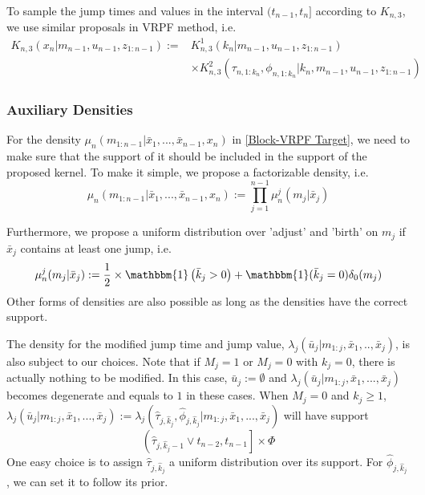 \documentclass[12pt,a4paper]{article}
\begin{document}
To sample the jump times and values in the interval $(t_{n-1},t_n]$ according to $K_{n,3}$, we use similar proposals in VRPF method, i.e. 
\begin{equation}
\label{BlockVRPF-ProposedX}
\begin{split}
K_{n,3}\left(x_n|m_{n-1},u_{n-1},z_{1:n-1}\right):=& K_{n,3}^{1}\left(k_n|m_{n-1},u_{n-1},z_{1:n-1}\right)\\
& \times K_{n,3}^{2}\left(\tau_{n,1:k_n},\phi_{n,1:k_n}|k_n,m_{n-1},u_{n-1},z_{1:n-1}\right)
\end{split}
\end{equation}

\subsubsection{Auxiliary Densities}
For the density $\mu_n\left(m_{1:n-1}|\bar{x}_{1},...,\bar{x}_{n-1},x_n\right)$ in \eqref{Block-VRPF Target}, we need to make sure that the support of it should be included in the support of the proposed kernel. To make it simple, we propose a factorizable density, i.e.
\begin{equation*}
    \mu_n\left(m_{1:n-1}|\bar{x}_{1},...,\bar{x}_{n-1},x_{n}\right) := \prod_{j=1}^{n-1} \mu_{n}^{j}\left(m_j|\bar{x}_{j}\right)
\end{equation*}

Furthermore, we propose a uniform distribution over 'adjust' and 'birth' on $m_{j}$ if $\bar{x}_{j}$ contains at least one jump, i.e.
$$\mu_n^j(m_j|\bar{x}_j) := \frac{1}{2}\times \mathbbm{1}\left(\bar{k}_j > 0\right) + \mathbbm{1}(\bar{k}_j=0)\delta_{0}(m_j)$$
Other forms of densities are also possible as long as the densities have the correct support. 

The density for the modified jump time and jump value, $\lambda_{j}\left(\bar{u}_{j}|m_{1:j},\bar{x}_1,..,\bar{x}_j\right)$, is also subject to our choices. Note that if $M_{j} = 1$ or $M_{j}=0$ with $k_{j}=0$, there is actually nothing to be modified. In this case, $\bar{u}_{j} := \emptyset$ and  $\lambda_{j}\left(\bar{u}_{j}|m_{1:j},\bar{x}_1,...,\bar{x}_j\right)$ becomes degenerate and equals to $1$ in these cases. When $M_{j}=0$ and $k_{j} \geq 1$, $\lambda_{j}\left(\bar{u}_{j}|m_{1:j},\bar{x}_1,...,\bar{x}_j\right) := \lambda_{j}\left(\hat{\tau}_{j,\hat{k}_{j}},\hat{\phi}_{j,\hat{k}_{j}}|m_{1:j},\bar{x}_1,...,\bar{x}_j\right)$ will have support 
$$\left(\hat{\tau}_{j,\hat{k}_{j}-1} \vee t_{n-2},t_{n-1}\right] \times \Phi$$
One easy choice is to assign $\hat{\tau}_{j,\hat{k}_{j}}$ a uniform distribution over its support. For $\hat{\phi}_{j,\hat{k}_{j}}$, we can set it to follow its prior. 
\end{document}
